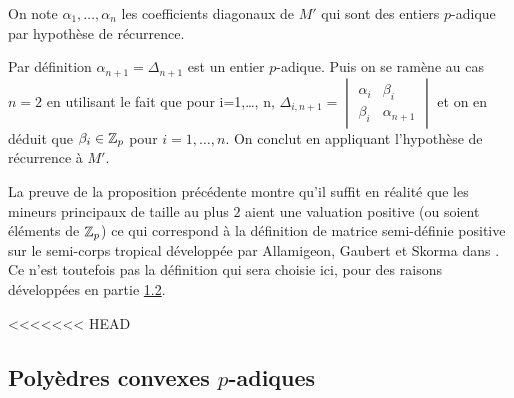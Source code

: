 On note $ \alpha_1,\ldots, \alpha_n$ les coefficients diagonaux de $M'$ qui sont des entiers $p$-adique par hypothèse de récurrence. 


 Par définition $ \alpha_{n+1} = \Delta_{n+1}$ est un entier $p$-adique. Puis on se ramène au cas $n=2$ en utilisant le fait que pour i=1,\ldots, n, $\Delta_{i,n+1} = \begin{vmatrix} \alpha_{i} & \beta_{i}\\ \beta_{i} & \alpha_{n+1} \end{vmatrix} $ et on en déduit que $\beta_{i} \in  \mathbb {Z}_p $ pour $i=1,\ldots,n$. On conclut en appliquant l'hypothèse de récurrence à $M'$.


\hfill \qedsymbol
\begin{remarque}
	
	La preuve de la proposition précédente montre qu'il suffit en réalité que les mineurs principaux de taille au plus $2$ aient une valuation positive (ou soient éléments de $ \mathbb {Z}_p $) ce qui correspond à la définition de matrice semi-définie positive sur le semi-corps tropical développée par Allamigeon, Gaubert et Skorma dans \cite{allamigeon_tropical_2020} . Ce n'est toutefois pas la définition qui sera choisie ici, pour des raisons développées en partie \hyperlink{subsection.1.2}{1.2}.
\end{remarque}

<<<<<<< HEAD
\fi


\subsection{Polyèdres convexes \texorpdfstring{$p$}{p}-adiques} 

